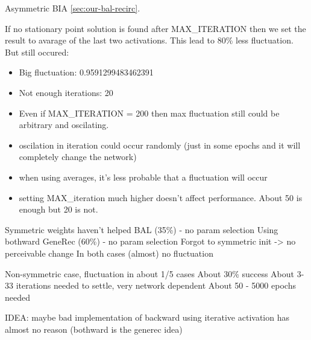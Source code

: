 Asymmetric BIA \ref{sec:our-bal-recirc}.

If no stationary point solution is found after MAX\_ITERATION then we set the result to avarage of the last two activations. This lead to 80\% less fluctuation. But still occured: 
\begin{itemize}
\item Big fluctuation: 0.9591299483462391
\item Not enough iterations: 20
\item Even if MAX\_ITERATION = 200 then max fluctuation still could be arbitrary and oscilating.
\end{itemize} 

\begin{itemize} 
  \item oscilation in iteration could occur randomly (just in some epochs and it will completely change the network) 
  \item when using averages, it's less probable that a fluctuation will occur 
  \item setting MAX\_iteration much higher doesn't affect performance. About 50 is enough but 20 is not. 
\end{itemize} 
  
Symmetric weights haven't helped BAL (35\%) - no param selection
Using bothward GeneRec (60\%) - no param selection 
  Forgot to symmetric init -> no perceivable change 
In both cases (almost) no fluctuation 

Non-symmetric case, fluctuation in about 1/5 cases 
  About 30\% success 
  About 3-33 iterations needed to settle, very network dependent 
  About 50 - 5000 epochs needed 

IDEA: maybe bad implementation of backward
      using iterative activation has almost no reason (bothward is the generec idea) 


